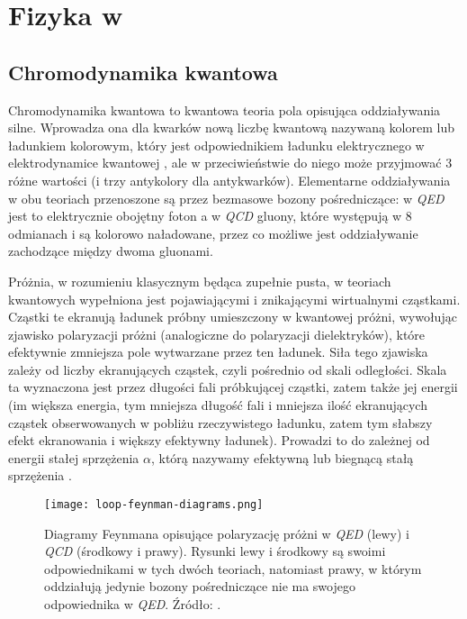 \section{Fizyka w}


\subsection*{Chromodynamika kwantowa}

Chromodynamika kwantowa  to kwantowa teoria pola opisująca oddziaływania silne. Wprowadza ona dla kwarków nową liczbę kwantową nazywaną kolorem lub ładunkiem kolorowym, który jest odpowiednikiem ładunku elektrycznego w elektrodynamice kwantowej , ale w przeciwieństwie do niego może przyjmować 3 różne wartości (i trzy antykolory dla antykwarków). Elementarne oddziaływania w obu teoriach przenoszone są przez bezmasowe bozony pośredniczące: w \textit{QED} jest to elektrycznie obojętny foton a w \textit{QCD} gluony, które występują w 8 odmianach i są kolorowo naładowane, przez co możliwe jest oddziaływanie zachodzące między dwoma gluonami.

Próżnia, w rozumieniu klasycznym będąca zupełnie pusta, w teoriach kwantowych wypełniona jest pojawiającymi i znikającymi wirtualnymi cząstkami. Cząstki te ekranują ładunek próbny umieszczony w kwantowej próżni, wywołując zjawisko polaryzacji próżni (analogiczne do polaryzacji dielektryków), które efektywnie zmniejsza pole wytwarzane przez ten ładunek. 
Siła tego zjawiska zależy od liczby ekranujących cząstek, czyli pośrednio od skali odległości. Skala ta wyznaczona jest przez długości fali próbkującej cząstki, zatem także jej energii (im większa energia, tym mniejsza długość fali i mniejsza ilość ekranujących cząstek obserwowanych w pobliżu rzeczywistego ładunku, zatem tym słabszy efekt ekranowania i większy efektywny ładunek). Prowadzi to do zależnej od energii stałej sprzężenia $\alpha$, którą nazywamy  efektywną lub biegnącą stałą sprzężenia . 


\begin{figure}[h]
	\centering
	\texttt{[image: loop-feynman-diagrams.png]}
	\caption{Diagramy Feynmana opisujące polaryzację próżni w \textit{QED} (lewy) i \textit{QCD} (środkowy i prawy). Rysunki lewy i środkowy są swoimi odpowiednikami w tych dwóch teoriach, natomiast prawy, w którym oddziałują jedynie bozony pośredniczące nie ma swojego odpowiednika w \textit{QED}. Źródło: \cite{perkins_2005}.}
	\label{fig:feynman-diagrams}
\end{figure}

